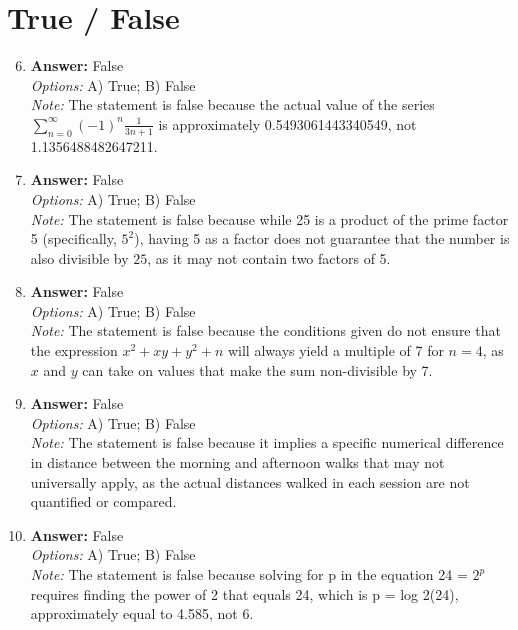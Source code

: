 \documentclass[12pt]{article}
\begin{document}
\section*{True / False}
\begin{enumerate}[label=\arabic*.]
\setcounter{enumi}{5}
\item \textbf{Answer:} False
\\ \textit{Options:} A) True; B) False
\\ \textit{Note:} The statement is false because the actual value of the series \(\sum_{n=0}^{\infty}(-1)^n \frac{1}{3 n+1}\) is approximately 0.5493061443340549, not 1.1356488482647211.
\item \textbf{Answer:} False
\\ \textit{Options:} A) True; B) False
\\ \textit{Note:} The statement is false because while 25 is a product of the prime factor 5 (specifically, \(5^2\)), having 5 as a factor does not guarantee that the number is also divisible by \(25\), as it may not contain two factors of 5.
\item \textbf{Answer:} False
\\ \textit{Options:} A) True; B) False
\\ \textit{Note:} The statement is false because the conditions given do not ensure that the expression \(x^2 + xy + y^2 + n\) will always yield a multiple of 7 for \(n = 4\), as \(x\) and \(y\) can take on values that make the sum non-divisible by 7.
\item \textbf{Answer:} False
\\ \textit{Options:} A) True; B) False
\\ \textit{Note:} The statement is false because it implies a specific numerical difference in distance between the morning and afternoon walks that may not universally apply, as the actual distances walked in each session are not quantified or compared.
\item \textbf{Answer:} False
\\ \textit{Options:} A) True; B) False
\\ \textit{Note:} The statement is false because solving for p in the equation 24 = $2^p$ requires finding the power of 2 that equals 24, which is p = log 2(24), approximately equal to 4.585, not 6.
\end{enumerate}
\end{document}
